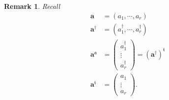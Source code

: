 \documentclass[aps, preprint]{revtex4}
\newtheorem{remark}[theorem]{Remark}
\begin{document}
\begin{remark}
Recall
\begin{align}\mathbf{a} &  =\left (a_{1} ,\cdots  ,a_{r}\right ) \\
\mathbf{a}^{ \dag } &  =\left (a_{1}^{ \dag } ,\cdots  ,a_{r}^{ \dag }\right ) \\
\mathbf{a}^{\mathfrak{a}} &  =\left (\begin{array}{c}a_{1}^{ \dag } \\
\vdots  \\
a_{r}^{ \dag }\end{array}\right ) =\left (\mathbf{a}^{ \dag }\right )^{\mathfrak{t}} \\
\mathbf{a}^{\mathfrak{t}} &  =\left (\begin{array}{c}a_{1} \\
\vdots  \\
a_{r}\end{array}\right )\text{.}\end{align}
\end{remark}
\end{document}

